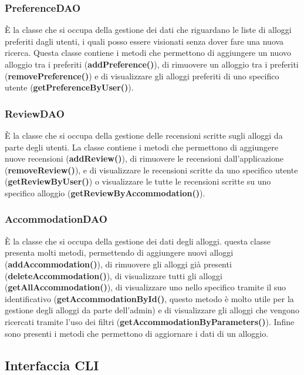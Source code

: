 \documentclass[10pt]{article}
\begin{document}
\subsubsection{PreferenceDAO}

\`E la classe che si occupa della gestione dei dati che riguardano le liste di alloggi preferiti dagli utenti, i quali posso essere visionati senza dover fare una nuova ricerca. Questa classe contiene i metodi che permettono di aggiungere un nuovo alloggio tra i preferiti (\textbf{addPreference()}), di rimuovere un alloggio tra i preferiti (\textbf{removePreference()}) e di visualizzare gli alloggi preferiti di uno specifico utente (\textbf{getPreferenceByUser()}). 

\subsubsection{ReviewDAO}

\`E la classe che si occupa della gestione delle recensioni scritte sugli alloggi da parte degli utenti. La classe contiene i metodi che permettono di aggiungere nuove recensioni (\textbf{addReview()}), di rimuovere le recensioni dall'applicazione (\textbf{removeReview()}), e di visualizzare le recensioni scritte da uno specifico utente (\textbf{getReviewByUser()}) o visualizzare le tutte le recensioni scritte su uno specifico alloggio (\textbf{getReviewByAccommodation()}). 

\subsubsection{AccommodationDAO}

\`E la classe che si occupa della gestione dei dati degli alloggi. questa classe presenta molti metodi, permettendo di aggiungere nuovi alloggi (\textbf{addAccommodation()}), di rimuovere gli alloggi già presenti (\textbf{deleteAccommodation()}), di visualizzare tutti gli alloggi (\textbf{getAllAccommodation()}), di visualizzare uno nello specifico tramite il suo identificativo (\textbf{getAccommodationById()}, questo metodo è molto utile per la gestione degli alloggi da parte dell'admin) e di visualizzare gli alloggi che vengono ricercati tramite l'uso dei filtri (\textbf{getAccommodationByParameters()}). Infine sono presenti i metodi che permettono di aggiornare i dati di un alloggio. 

\subsection{Interfaccia CLI}
\end{document}

